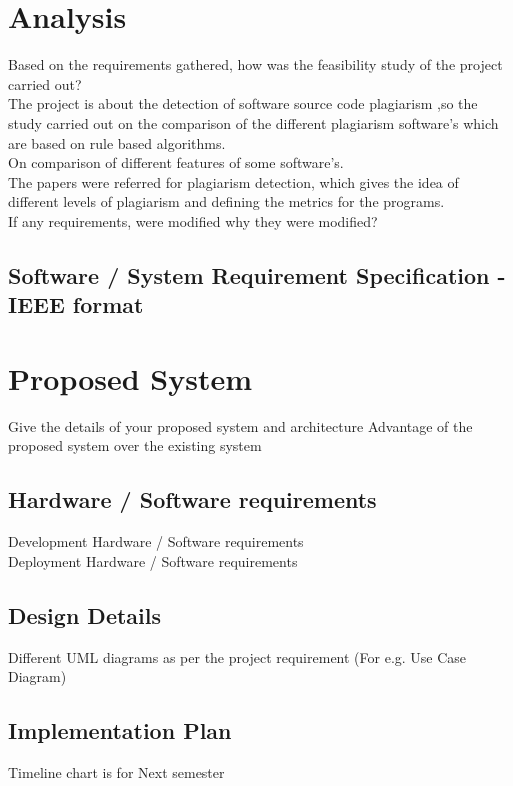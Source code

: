 \section{Analysis}

Based on the requirements gathered, how was the feasibility study of the project carried out? \\
The project is about the detection of software source code plagiarism ,so the study carried out on the comparison of the different plagiarism software's which are based on rule based algorithms.\\
On comparison of different features of some software's.\\
The papers were referred for plagiarism detection, which gives the idea of different levels of plagiarism and defining the metrics for the programs.  \\
If any requirements, were modified why they were modified? \\
\subsection{Software / System Requirement Specification - IEEE format}

\section{Proposed System}

Give the details of your proposed system and architecture 
Advantage of the proposed system over the existing system

\subsection{Hardware / Software requirements}
Development Hardware / Software requirements \\
Deployment Hardware / Software requirements \\

\subsection{Design Details}

Different UML diagrams as per the project requirement (For e.g. Use Case Diagram)

\subsection{Implementation Plan}

Timeline chart is for Next semester 




